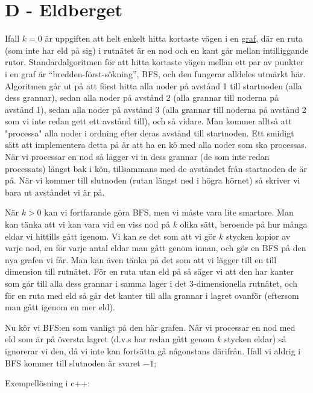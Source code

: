 \section*{D - Eldberget}

Ifall $k=0$ är uppgiften att helt enkelt hitta kortaste vägen i en \href{https://sv.wikipedia.org/wiki/Graf_(grafteori)}{graf},
där en ruta (som inte har eld på sig) i rutnätet är en nod och en kant går mellan intilliggande rutor.
Standardalgoritmen för att hitta kortaste vägen mellan ett par av punkter i en graf är ``bredden-först-sökning'', BFS, och den fungerar alldeles utmärkt här.
Algoritmen går ut på att först hitta alla noder på avstånd 1 till startnoden (alla dess grannar),
sedan alla noder på avstånd 2 (alla grannar till noderna på avstånd 1), sedan alla noder på avstånd 3
(alla grannar till noderna på avstånd 2 som vi inte redan gett ett avstånd till), och så vidare.
Man kommer alltså att "processa" alla noder i ordning efter deras avstånd till startnoden.
Ett smidigt sätt att implementera detta på är att ha en kö med alla noder som ska processas.
När vi processar en nod så lägger vi in dess grannar (de som inte redan processats) längst bak i kön,
tillsammans med de avståndet från startnoden de är på.
När vi kommer till slutnoden (rutan längst ned i högra hörnet) så skriver vi bara ut avståndet vi är på.

När $k>0$ kan vi fortfarande göra BFS, men vi måste vara lite smartare.
Man kan tänka att vi kan vara vid en viss nod på $k$ olika sätt, beroende på hur många eldar vi hittills gått igenom.
Vi kan se det som att vi gör $k$ stycken kopior av varje nod, en för varje antal eldar man gått genom innan, och gör en BFS på den nya grafen vi får.
Man kan även tänka på det som att vi lägger till en till dimension till rutnätet.
För en ruta utan eld på så säger vi att den har kanter som går till alla dess grannar i samma lager i det 3-dimensionella rutnätet,
och för en ruta med eld så går det kanter till alla grannar i lagret ovanför (eftersom man gått igenom en mer eld).

Nu kör vi BFS:en som vanligt på den här grafen. När vi processar en nod med eld som är på översta lagret (d.v.s har redan gått genom $k$ stycken eldar) så ignorerar vi den,
då vi inte kan fortsätta gå någonstans därifrån. Ifall vi aldrig i BFS kommer till slutnoden är svaret $-1$;

Exempellösning i c++:

